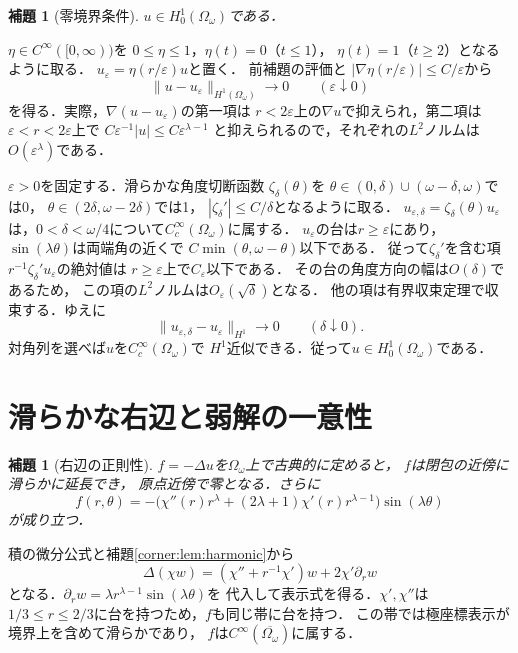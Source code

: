 \documentclass[a5paper,10pt,onecolumn]{jsarticle}
\makeatletter
\theoremstyle{mathnotetheorem}
\newtheorem{lemma}[theorem]{補題}
\renewcommand{\proofname}{証明}
\renewenvironment{proof}[1][\proofname]{%
  \par\pushQED{\qed}\normalfont\topsep4\p@\@plus2\p@\relax
  \trivlist\item[\hskip\labelsep\bfseries #1]\ignorespaces
}{\popQED\endtrivlist\@endpefalse}
\makeatother
\begin{document}
\begin{lemma}[零境界条件]\label{corner:lem:H0}
$u\in H_0^1(\Omega_\omega)$である．
\end{lemma}
\begin{proof}
$\eta\in C^\infty([0,\infty))$を
$0\le\eta\le1$，$\eta(t)=0$（$t\le1$），
$\eta(t)=1$（$t\ge2$）となるように取る．
$u_\varepsilon=\eta(r/\varepsilon)u$と置く．
前補題の評価と
$|\nabla\eta(r/\varepsilon)|\le C/\varepsilon$から
\[
 \|u-u_\varepsilon\|_{H^1(\Omega_\omega)}
       \longrightarrow0\qquad(\varepsilon\downarrow0)
\]
を得る．実際，$\nabla(u-u_\varepsilon)$の第一項は
$r<2\varepsilon$上の$\nabla u$で抑えられ，第二項は
$\varepsilon<r<2\varepsilon$上で
$C\varepsilon^{-1}|u|\le C\varepsilon^{\lambda-1}$
と抑えられるので，それぞれの$L^2$ノルムは
$O(\varepsilon^\lambda)$である．

$\varepsilon>0$を固定する．滑らかな角度切断函数
$\zeta_\delta(\theta)$を
$\theta\in(0,\delta)\cup(\omega-\delta,\omega)$では0，
$\theta\in(2\delta,\omega-2\delta)$では1，
$|\zeta_\delta'|\le C/\delta$となるように取る．
$u_{\varepsilon,\delta}=\zeta_\delta(\theta)u_\varepsilon$
は，$0<\delta<\omega/4$について$C_c^\infty(\Omega_\omega)$に属する．
$u_\varepsilon$の台は$r\ge\varepsilon$にあり，
$\sin(\lambda\theta)$は両端角の近くで
$C\min(\theta,\omega-\theta)$以下である．
従って$\zeta_\delta'$を含む項
$r^{-1}\zeta_\delta' u_\varepsilon$の絶対値は
$r\ge\varepsilon$上で$C_\varepsilon$以下である．
その台の角度方向の幅は$O(\delta)$であるため，
この項の$L^2$ノルムは$O_\varepsilon(\sqrt\delta)$となる．
他の項は有界収束定理で収束する．ゆえに
\[
 \|u_{\varepsilon,\delta}-u_\varepsilon\|_{H^1}
   \longrightarrow0\qquad(\delta\downarrow0).
\]
対角列を選べば$u$を$C_c^\infty(\Omega_\omega)$で
$H^1$近似できる．従って$u\in H_0^1(\Omega_\omega)$である．
\end{proof}

\section{滑らかな右辺と弱解の一意性}
\begin{lemma}[右辺の正則性]\label{corner:lem:rhs}
$f=-\Delta u$を$\Omega_\omega$上で古典的に定めると，
$f$は閉包の近傍に滑らかに延長でき，
原点近傍で零となる．さらに
\[
 f(r,\theta)=-\bigl(\chi''(r)r^\lambda
      +(2\lambda+1)\chi'(r)r^{\lambda-1}\bigr)
      \sin(\lambda\theta)
\]
が成り立つ．
\end{lemma}
\begin{proof}
積の微分公式と補題\ref{corner:lem:harmonic}から
\[
 \Delta(\chi w)=(\chi''+r^{-1}\chi')w
                +2\chi'\partial_rw
\]
となる．$\partial_rw=\lambda r^{\lambda-1}\sin(\lambda\theta)$を
代入して表示式を得る．$\chi',\chi''$は
$1/3\le r\le2/3$に台を持つため，$f$も同じ帯に台を持つ．
この帯では極座標表示が境界上を含めて滑らかであり，
$f$は$C^\infty(\overline{\Omega_\omega})$に属する．
\end{proof}
\end{document}

